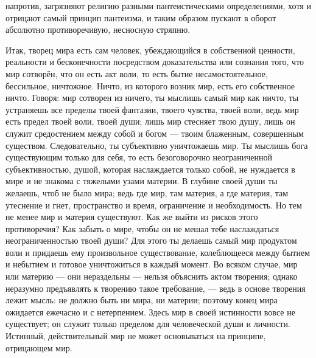 \documentclass[12pt,oneside]{book}
\begin{document}
напротив, загрязняют религию разными пантеистическими определениями, хотя и отрицают самый принцип пантеизма, и таким образом пускают в оборот абсолютно противоречивую, несносную стряпню.



Итак, творец мира есть сам человек, убеждающийся в собственной ценности, реальности и бесконечности посредством доказательства или сознания того, что мир сотворён, что он есть акт воли, то есть бытие несамостоятельное, бессильное, ничтожное. Ничто, из которого возник мир, есть его собственное ничто. Говоря: мир сотворен из ничего, ты мыслишь самый мир как ничто, ты устраняешь все пределы твоей фантазии, твоего чувства, твоей воли, ведь мир есть предел твоей воли, твоей души; лишь мир стесняет твою душу, лишь он служит средостением между собой и богом --- твоим блаженным, совершенным существом. Следовательно, ты субъективно уничтожаешь мир. Ты мыслишь бога существующим только для себя, то есть безоговорочно неограниченной субъективностью, душой, которая наслаждается только собой, не нуждается в мире и не знакома с тяжелыми узами материи. В глубине своей души ты желаешь, чтоб не было мира; ведь где мир, там материя, а где материя, там утеснение и гнет, пространство и время, ограничение и необходимость. Но тем не менее мир и материя существуют. Как же выйти из рисков этого противоречия? Как забыть о мире, чтобы он не мешал тебе наслаждаться неограниченностью твоей души? Для этого ты делаешь самый мир продуктом воли и придаешь ему произвольное существование, колеблющееся между бытием и небытием и готовое уничтожиться в каждый момент. Во всяком случае, мир или материю --- они нераздельны --- нельзя объяснить актом творения; однако неразумно предъявлять к творению такое требование, --- ведь в основе творения лежит мысль: не должно быть ни мира, ни материи; поэтому конец мира ожидается ежечасно и с нетерпением. Здесь мир в своей истинности вовсе не существует; он служит только пределом для человеческой души и личности. Истинный, действительный мир не может основываться на принципе, отрицающем мир.
\end{document}
